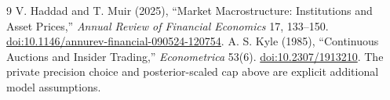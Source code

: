 \documentclass[11pt,a4paper]{article}
\theoremstyle{remark}
\begin{document}
\begin{thebibliography}{9}
 V. Haddad and T. Muir (2025), ``Market Macrostructure: Institutions and Asset Prices,'' \emph{Annual Review of Financial Economics} 17, 133--150. \href{https://doi.org/10.1146/annurev-financial-090524-120754}{doi:10.1146/annurev-financial-090524-120754}.
 A. S. Kyle (1985), ``Continuous Auctions and Insider Trading,'' \emph{Econometrica} 53(6). \href{https://doi.org/10.2307/1913210}{doi:10.2307/1913210}. The private precision choice and posterior-scaled cap above are explicit additional model assumptions.
\end{thebibliography}
\end{document}
